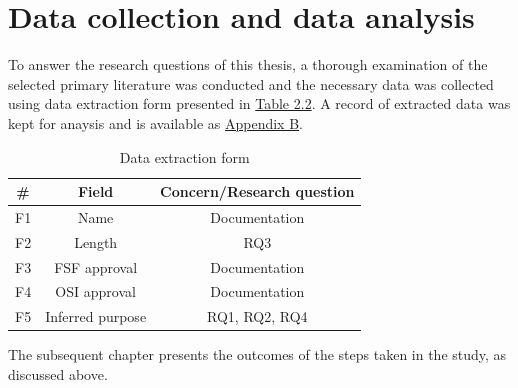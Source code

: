 \section{Data collection and data analysis}
To answer the research questions of this thesis, a thorough examination of the selected primary literature was conducted and the necessary data was collected using data extraction form presented in \hyperref[table:extraction]{Table 2.2}. A record of extracted data was kept for anaysis and is available as \hyperref[appendix:b]{Appendix B}.

\begin{table}[t]
	\begin{center}
		\begin{tabular}{||c c c||} 
			\hline
			\# & Field & Concern/Research question \\
			\hline
			F1 & Name & Documentation \\
			F2 & Length & RQ3 \\
			F3 & FSF approval &  Documentation\\
			F4 & OSI approval & Documentation \\
			F5 & Inferred purpose & RQ1, RQ2, RQ4 \\
			\hline
		\end{tabular}
		\caption{Data extraction form}
		\label{table:extraction}
	\end{center}
\end{table}

The subsequent chapter presents the outcomes of the steps taken in the study, as discussed above.